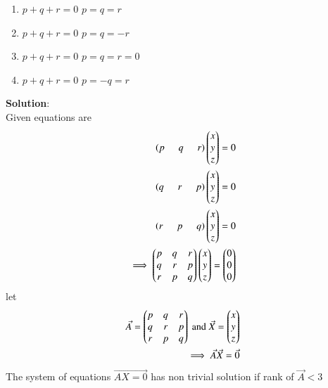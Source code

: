 \documentclass[journal]{IEEEtran}
\begin{document}
\begin{enumerate}
    \item[(a)] $p + q + r = 0$  $p = q = r$
    \item[(b)] $p + q + r = 0$  $p = q = -r$
    \item[(c)] $p + q + r = 0$  $p = q = r = 0$
    \item[(d)] $p + q + r = 0$  $p = -q = r$
\end{enumerate}
\textbf{Solution}:\\
Given equations are
\begin{align}
   \left(p\hspace{0.5cm}q\hspace{0.5cm}r\right)\begin{pmatrix}x\\y\\z\end{pmatrix}=0\\
   \left(q\hspace{0.5cm}r\hspace{0.5cm}p\right)\begin{pmatrix}x\\y\\z\end{pmatrix}=0\\
   \left(r\hspace{0.5cm}p\hspace{0.5cm}q\right)\begin{pmatrix}x\\y\\z\end{pmatrix}=0\\
   \implies \begin{pmatrix}
        p & q & r\\
        q & r & p\\
        r & p & q
    \end{pmatrix} \begin{pmatrix}x\\y\\z\end{pmatrix} =\begin{pmatrix}0\\0\\0\end{pmatrix}
\end{align}
let 
\begin{align}
    \Vec{A}=\begin{pmatrix}
        p & q & r\\
        q & r & p\\
        r & p & q
    \end{pmatrix} \text{ and } \Vec{X}=\begin{pmatrix}x\\y\\z\end{pmatrix}\\
    \implies \Vec{A}\Vec{X}=\Vec{0}
\end{align}
The system of equations $\Vec{AX = 0}$ has non trivial solution if rank of $\Vec{A}<3$
\end{document}
